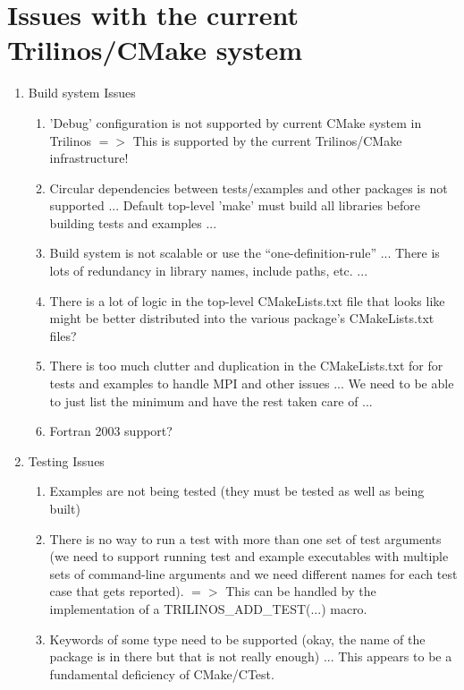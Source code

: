 \documentclass[pdf,ps2pdf,11pt]{SANDreport}
\begin{document}
%
\section{Issues with the current Trilinos/CMake system}
%

\begin{enumerate}

{}\item Build system Issues

  \begin{enumerate}

  {}\item 'Debug' configuration is not supported by current CMake
  system in Trilinos $=>$ This is supported by the current
  Trilinos/CMake infrastructure!

  {}\item Circular dependencies between tests/examples and other
  packages is not supported ... Default top-level 'make' must build
  all libraries before building tests and examples ...

  {}\item Build system is not scalable or use the
  ``one-definition-rule'' ... There is lots of redundancy in library
  names, include paths, etc. ...

  {}\item There is a lot of logic in the top-level CMakeLists.txt file
  that looks like might be better distributed into the various
  package's CMakeLists.txt files?

  {}\item There is too much clutter and duplication in the
  CMakeLists.txt for for tests and examples to handle MPI and other
  issues ... We need to be able to just list the minimum and have the
  rest taken care of ...

  {}\item Fortran 2003 support?

  \end{enumerate}

{}\item Testing Issues

  \begin{enumerate}

  {}\item Examples are not being tested (they must be tested as well
  as being built)

  {}\item There is no way to run a test with more than one set of test
  arguments (we need to support running test and example executables
  with multiple sets of command-line arguments and we need different
  names for each test case that gets reported).  $=>$ This can be
  handled by the implementation of a TRILINOS\_ADD\_TEST(...) macro.

  {}\item Keywords of some type need to be supported (okay, the name
  of the package is in there but that is not really enough) ... This
  appears to be a fundamental deficiency of CMake/CTest.

  \end{enumerate}

\end{enumerate}
\end{document}

